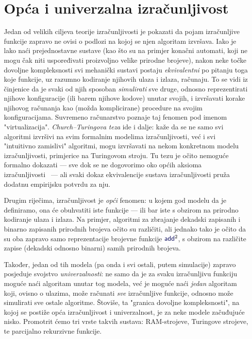 \section{Opća i univerzalna izračunljivost}

Jedan od velikih ciljeva teorije izračunljivosti je pokazati da pojam izračunljive funkcije zapravo ne ovisi o podlozi na kojoj se njen algoritam izvršava. Iako je lako naći prejednostavne sustave (kao što su na primjer konačni automati, koji ne mogu čak niti uspoređivati proizvoljno velike prirodne brojeve), nakon neke točke dovoljne kompleksnosti svi mehanički sustavi postaju \emph{ekvivalentni} po pitanju toga koje funkcije, uz razumno kodiranje njihovih ulaza i izlaza, računaju. To se vidi iz činjenice da je svaki od njih sposoban \emph{simulirati} sve druge, odnosno reprezentirati njihove konfiguracije (ili barem njihove kodove) unutar svojih, i izvršavati korake njihovog računanja kao (možda komplicirane) procedure na svojim konfiguracijama. Suvremeno računarstvo poznaje taj fenomen pod imenom "virtualizacija". \emph{Church--\!Turingova teza} ide i dalje: kaže da se ne samo svi algoritmi izvršivi na svim formalnim modelima izračunljivosti, već i svi "intuitivno zamislivi" algoritmi, mogu izvršavati na nekom konkretnom modelu izračunljivosti, primjerice na Turingovom stroju. Tu tezu je očito nemoguće formalno dokazati --- sve dok se ne dogovorimo oko općih aksioma izračunljivosti~\cite{dershowitz} --- ali svaki dokaz ekvivalencije sustava izračunljivosti pruža dodatnu empirijsku potvrdu za nju.

Drugim riječima, izračunljivost je \emph{opći} fenomen: u kojem god modelu da je definiramo, ona će obuhvatiti iste funkcije --- ili bar iste s obzirom na prirodno kodiranje ulaza i izlaza. Na primjer, algoritmi za zbrajanje dekadski zapisanih i binarno zapisanih prirodnih brojeva očito su različiti, ali jednako tako je očito da su oba zapravo samo reprezentacije brojevne funkcije $\f{add}^2$, s obzirom na različite zapise (dekadski odnosno binarni) samih prirodnih brojeva.

Također, jedan od tih modela (pa onda i svi ostali, putem simulacije) zapravo posjeduje svojstvo \emph{univerzalnosti}: ne samo da je za svaku izračunljivu funkciju moguće naći algoritam unutar tog modela, već je moguće naći \emph{jedan} algoritam koji, ovisno o ulazima, može računati \emph{sve} izračunljive funkcije, odnosno može simulirati sve ostale algoritme. Štoviše, ta "granica dovoljne kompleksnosti", na kojoj se postiže opća izračunljivost i univerzalnost, je za neke modele začuđujuće nisko. Promotrit ćemo tri vrste takvih sustava: RAM-strojeve, Turingove strojeve, te parcijalno rekurzivne funkcije.
